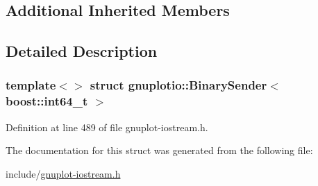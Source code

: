 \subsection*{Additional Inherited Members}


\subsection{Detailed Description}
\subsubsection*{template$<$$>$\newline
struct gnuplotio\+::\+Binary\+Sender$<$ boost\+::int64\+\_\+t $>$}



Definition at line 489 of file gnuplot-\/iostream.\+h.



The documentation for this struct was generated from the following file\+:\begin{DoxyCompactItemize}
\item 
include/\hyperlink{gnuplot-iostream_8h}{gnuplot-\/iostream.\+h}\end{DoxyCompactItemize}
